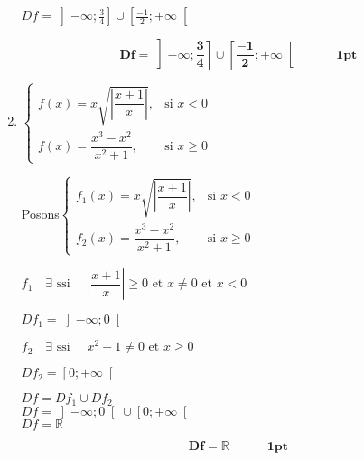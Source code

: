 \documentclass[12pt,a4paper]{article}
\begin{document}
\begin{enumerate}
\begin{center}
\( Df = \left]-\infty;\frac{3}{4}\right] \cup \left[\frac{-1}{2} ; +\infty\right[ \) 
\end{center}

          \begin{resultbox}
            \[
                \mathbf{Df = \left]-\infty;\frac{3}{4}\right] \cup \left[\frac{-1}{2} ; +\infty\right[\quad\quad\quad \textbf{1pt}}
            \]
        \end{resultbox} 

    \item $\left\{
        \begin{array}{ll}
            f(x) = x \sqrt{\left| \dfrac{x+1}{x} \right|}, & \text{si } x < 0 \\
            f(x) = \dfrac{x^3 - x^2}{x^2 + 1}, & \text{si } x \geq 0
        \end{array}
    \right.$

Posons$\left\{
        \begin{array}{ll}
            f_{1}(x) = x \sqrt{\left| \dfrac{x+1}{x} \right|}, & \text{si } x < 0 \\
            f_{2}(x) = \dfrac{x^3 - x^2}{x^2 + 1}, & \text{si } x \geq 0
        \end{array}
    \right.$    

\( f_{1}\quad \exists \text{ ssi } \quad  \left| \dfrac{x+1}{x} \right| \geq 0 \text{ et } x \neq 0 \text{ et } x < 0\)    

\( Df_{1} = \left]-\infty;0\right[ \)

\( f_{2}\quad \exists \text{ ssi } \quad  x^2 + 1 \neq 0 \text{ et } x \geq 0\)    

\( Df_{2} = \left[0;+\infty\right[ \)

\begin{center}
\( Df=Df_{1} \cup Df_{2} \)\\
\( Df=\left]-\infty;0\right[ \cup \left[0;+\infty\right[ \)\\
\( Df=\mathbb{R} \)
\end{center}    

              \begin{resultbox}
            \[
                \mathbf{Df = \mathbb{R}\quad\quad\quad \textbf{1pt}}
            \]
        \end{resultbox} 
    
\end{enumerate}
\end{document}
